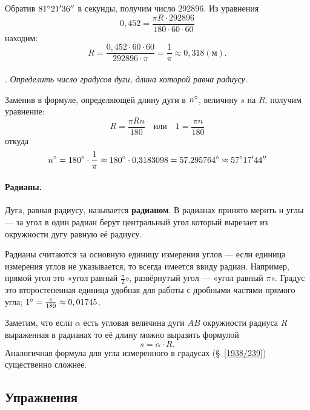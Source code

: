 \documentclass[twoside]{book}
\makeatletter
\newcommand{\rindex}[2][\imki@jobname]{%
  \index[#1]{\detokenize{#2}}%
}
\makeatother
\begin{document}
Обратив $81\degree 21'36''$ в секунды, получим число 292896.
Из уравнения
\[0{,}452 = \frac{\pi R\cdot  292896}{180\cdot 60\cdot 60}\]
находим:
\[R=\frac{0{,}452\cdot 60\cdot 60}{292896\cdot \pi}=\frac1\pi\approx0{,}318 (\text{м}).\]

\paragraph{}\label{1938/241}
.
\emph{Определить число градусов дуги, длина которой равна радиусу.}

Заменив в формуле, определяющей длину дуги в $n\degree$, величину $s$ на $R$, получим уравнение:
\[R=\frac{\pi R n}{180}
\quad\text{или}\quad
1=\frac{\pi n}{180}\]
откуда
\[n\degree = 180\degree \cdot \frac1\pi \approx 180\degree \cdot 0{,}3183098 = 57{,}295764\degree \approx 57\degree17'44''\]

\paragraph{Радианы.}\label{extra/radians}
Дуга, равная радиусу, называется \rindex{радиан}\textbf{радианом}.
В радианах принято мерить и углы — за угол в один радиан берут центральный угол который вырезает из окружности дугу равную её радиусу.

Радианы считаются за основную единицу измерения углов --- если единица измерения углов не указывается, то всегда имеется ввиду радиан.
Например, прямой угол это «угол равный $\tfrac\pi2$», развёрнутый угол --- «угол равный $\pi$».
Градус это второстепенная единица удобная для работы с дробными частями прямого угла;
$1\degree =\tfrac\pi{180}\approx 0{,01745}$.

Заметим, что если $\alpha$ есть угловая величина дуги $AB$ окружности радиуса $R$ выраженная в радианах то её длину можно выразить формулой
\[s=\alpha\cdot R.\]
Аналогичная формула для угла измеренного в градусах (§~\ref{1938/239}) существенно сложнее.

\subsection*{Упражнения}
\end{document}
